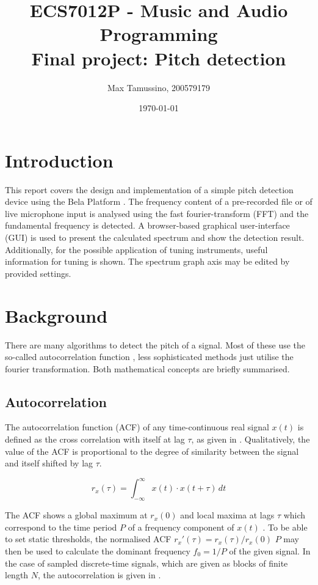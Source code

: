 \documentclass[a4paper, 12pt]{article}
\title{ECS7012P - Music and Audio Programming\\
	   Final project: Pitch detection}
\author{
  Max Tamussino, 200579179
}
\date{\today}
\begin{document}
\maketitle
\tableofcontents
\pagebreak


\section{Introduction} \label{sec:intro}
This report covers the design and implementation of a simple pitch detection device using the Bela Platform \cite{McPherson2015}. The frequency content of a pre-recorded file or of live microphone input is analysed using the fast fourier-transform (FFT) and the fundamental frequency is detected. A browser-based graphical user-interface (GUI) is used to present the calculated spectrum and show the detection result. Additionally, for the possible application of tuning instruments, useful information for tuning is shown. The spectrum graph axis may be edited by provided settings.


\section{Background}
There are many algorithms to detect the pitch of a signal. Most of these use the so-called autocorrelation function \cite{Amado2008}, less sophisticated methods just utilise the fourier transformation. Both mathematical concepts are briefly summarised.

\subsection{Autocorrelation}
The autocorrelation function (ACF) of any time-continuous real signal $x(t)$ is defined as the cross correlation with itself \cite{Rao2020} at lag $\tau$, as given in . Qualitatively, the value of the ACF is proportional to the degree of similarity \cite{Apicella2013} between the signal and itself shifted by lag $\tau$.

\begin{equation}
	\label{eq:autocorr-c}
	r_x(\tau) = \int_{-\infty}^{\infty} x(t) \cdot x(t + \tau) \, dt
\end{equation}

The ACF shows a global maximum at $r_x(0)$ and local maxima at lags $\tau$ which correspond to the time period $P$ of a frequency component of $x(t)$ \cite{Rabiner1977,Staudacher2016}. To be able to set static thresholds, the normalised ACF $r_x'(\tau) = r_x(\tau) / r_x(0)$ $P$ may then be used to calculate the dominant frequency $f_0=1/P$ of the given signal. In the case of sampled discrete-time signals, which are given as blocks of finite length $N$, the autocorrelation is given in .
\end{document}

